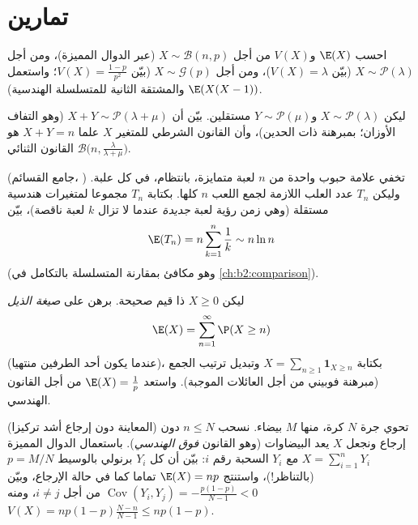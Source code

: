 \section{تمارين}

\begin{exercise}[$\star$]\label{exo:b2:randomvar:1}
احسب $\E(X)$ و$V(X)$ من أجل $X \sim \mathcal{B}(n, p)$ (عبر الدوال المميزة)، ومن أجل
$X \sim \mathcal{P}(\lambda)$ (بيّن $V(X) =
\lambda$)، ومن أجل $X \sim \mathcal{G}(p)$ (بيّن $V(X) =
\frac{1-p}{p^2}$؛ واستعمل $\E(X(X-1))$
والمشتقة الثانية للمتسلسلة الهندسية).
\end{exercise}

\begin{exercise}[$\star$]\label{exo:b2:randomvar:2}
ليكن $X \sim \mathcal{P}(\lambda)$ و$Y \sim \mathcal{P}(\mu)$ مستقلين. بيّن أن $X + Y \sim \mathcal{P}(\lambda + \mu)$ (وهو التفاف الأوزان؛
بمبرهنة ذات الحدين)، وأن القانون الشرطي للمتغير $X$ علما 
$X + Y = n$ هو القانون الثنائي $\mathcal{B}\bigl(n, \frac{\lambda}{\lambda + \mu}\bigr)$.
\end{exercise}

\begin{exercise}[$\star$]\label{exo:b2:randomvar:3}
(جامع القسائم، ) تخفي علامة حبوب واحدة من $n$ لعبة
متمايزة، بانتظام، في كل علبة. وليكن $T_n$ عدد العلب اللازمة لجمع
اللعب $n$ كلها. بكتابة $T_n$ مجموعا لمتغيرات هندسية مستقلة (وهي
زمن رؤية لعبة \emph{جديدة} عندما لا تزال $k$ لعبة ناقصة)، بيّن
\[
\E(T_n) = n\sum_{k=1}^{n}\frac{1}{k} \sim n\ln n
\]
(وهو مكافئ بمقارنة المتسلسلة بالتكامل في \cref{ch:b2:comparison}).
\end{exercise}

\begin{exercise}[$\star\star$]\label{exo:b2:randomvar:4}
ليكن $X \geq 0$ ذا قيم صحيحة. برهن على \emph{صيغة الذيل}
\[
\E(X) = \sum_{n=1}^{\infty} \P(X \geq n)
\]
(عندما يكون أحد الطرفين منتهيا)، بكتابة $X =
\sum_{n\geq1}\mathbf{1}_{X \geq n}$ وتبديل ترتيب الجمع
(مبرهنة فوبيني من أجل العائلات الموجبة). واستعد $\E(X) = \frac1p$ من أجل
القانون الهندسي.
\end{exercise}

\begin{exercise}[$\star\star$]\label{exo:b2:randomvar:5}
(المعاينة دون إرجاع أشد تركيزا) تحوي جرة $N$ كرة، منها $M$
بيضاء. نسحب $n \leq N$ دون إرجاع ونجعل $X$ يعد البيضاوات (وهو
القانون \emph{فوق الهندسي}). باستعمال الدوال المميزة $X = \sum_{i=1}^n Y_i$ مع
$Y_i$ السحبة رقم $i$: بيّن أن كل $Y_i$ برنولي بالوسيط $p = M/N$
(بالتناظر!)، واستنتج $\E(X) = np$ تماما كما في حالة الإرجاع، وبيّن $\operatorname{Cov}(Y_i, Y_j) = -\frac{p(1-p)}{N-1} < 0$
من أجل $i
\neq j$، ومنه $V(X) = np(1-p)\frac{N - n}{N - 1} \leq np(1-p)$.
\end{exercise}

